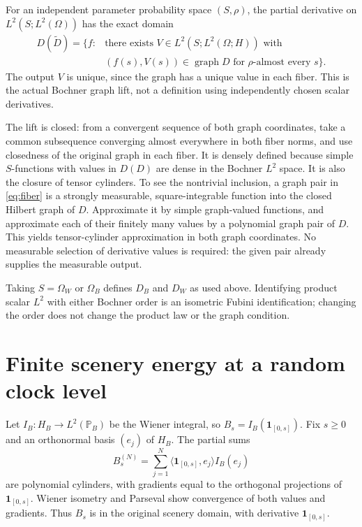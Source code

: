 \documentclass[11pt]{article}
\begin{document}
For an independent parameter probability space
$(S,\rho)$, the partial derivative on
$L^2(S;L^2(\Omega))$ has the exact domain
\begin{equation}\label{eq:fiber}
\begin{split}
 D(\widetilde D)=\{f: &\text{there exists }V\in L^2(S;L^2(\Omega;H))\text{ with}\\
 &(f(s),V(s))\in\operatorname{graph}D
           \text{ for }\rho\text{-almost every }s\}.
\end{split}
\end{equation}
The output $V$ is unique, since the graph has a unique
value in each fiber. This is the actual Bochner graph
lift, not a definition using independently chosen
scalar derivatives.

The lift is closed: from a convergent sequence of both
graph coordinates, take a common subsequence converging
almost everywhere in both fiber norms, and use closedness
of the original graph in each fiber. It is densely
defined because simple $S$-functions with values in
$D(D)$ are dense in the Bochner $L^2$ space.
It is also the closure of tensor cylinders. To see the
nontrivial inclusion, a graph pair in \eqref{eq:fiber}
is a strongly measurable, square-integrable function
into the closed Hilbert graph of $D$. Approximate it
by simple graph-valued functions, and approximate each
of their finitely many values by a polynomial graph
pair of $D$. This yields tensor-cylinder approximation
in both graph coordinates. No measurable selection of
derivative values is required: the given pair already
supplies the measurable output.

Taking $S=\Omega_W$ or $\Omega_B$ defines $D_B$ and
$D_W$ as used above. Identifying product scalar $L^2$
with either Bochner order is an isometric Fubini
identification; changing the order does not change the
product law or the graph condition.

\section{Finite scenery energy at a random clock level}
Let $I_B:H_B\to L^2(\mathbb P_B)$ be the Wiener integral,
so $B_s=I_B(\mathbf1_{[0,s]})$.
Fix $s\geq0$ and an orthonormal basis $(e_j)$ of $H_B$.
The partial sums
\[
 B_s^{(N)}=\sum_{j=1}^N
     \langle\mathbf1_{[0,s]},e_j\rangle I_B(e_j)
\]
are polynomial cylinders, with gradients equal to the
orthogonal projections of $\mathbf1_{[0,s]}$.
Wiener isometry and Parseval show convergence of both
values and gradients. Thus $B_s$ is in the original
scenery domain, with derivative $\mathbf1_{[0,s]}$.
\end{document}
